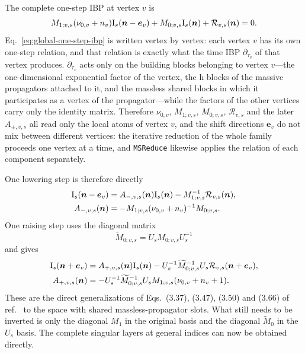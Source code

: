 \documentclass[11pt,a4paper]{article}
\newcommand{\cR}{\mathcal R}
\begin{document}
The complete one-step IBP at vertex $v$ is
\begin{equation}
 M_{1;v,s}(\nu_{0,v}+n_v)\bm{\text I}_s(\bm n-\bm e_v)
 +M_{0;v,s}\bm{\text I}_s(\bm n)
 +\cR_{v,s}(\bm n)=0.
 \label{eq:global-one-step-ibp}
\end{equation}
Eq.~\eqref{eq:global-one-step-ibp} is written vertex by vertex: each vertex $v$ has its own one-step
relation, and that relation is exactly what the time IBP $\partial_{\tau_v}$ of that vertex produces.
$\partial_{\tau_v}$ acts only on the building blocks belonging to vertex $v$---the one-dimensional
exponential factor of the vertex, the h blocks of the massive propagators attached to it, and the massless shared
blocks in which it participates as a vertex of the propagator---while the factors of the other vertices carry only the
identity matrix. Therefore $\nu_{0,v}$, $M_{1;v,s}$, $M_{0;v,s}$, $\cR_{v,s}$ and the later $A_{\pm,v,s}$
all read only the local atoms of vertex $v$, and the shift directions $\bm e_v$ do not mix between
different vertices: the iterative reduction of the whole family proceeds one vertex at a time, and
\texttt{MSReduce} likewise applies the relation of each component separately.

One lowering step is therefore directly
\begin{align}
 \bm{\text I}_s(\bm n-\bm e_v)
 &=A_{-,v,s}(\bm n)\bm{\text I}_s(\bm n)
 -M_{1;v,s}^{-1}\cR_{v,s}(\bm n),\\
 A_{-,v,s}(\bm n)
 &=-M_{1;v,s}(\nu_{0,v}+n_v)^{-1}M_{0;v,s}.
 \label{eq:global-Aminus}
\end{align}
One raising step uses the diagonal matrix
\begin{equation}
 \widetilde M_{0;v,s}=U_sM_{0;v,s}U_s^{-1}
\end{equation}
and gives
\begin{align}
 \bm{\text I}_s(\bm n+\bm e_v)
 &=A_{+,v,s}(\bm n)\bm{\text I}_s(\bm n)
 -U_s^{-1}\widetilde M_{0;v,s}^{-1}U_s
 \cR_{v,s}(\bm n+\bm e_v),\\
 A_{+,v,s}(\bm n)
 &=-U_s^{-1}\widetilde M_{0;v,s}^{-1}U_s
 M_{1;v,s}(\nu_{0,v}+n_v+1).
 \label{eq:global-Aplus}
\end{align}
These are the direct generalizations of Eqs.~(3.37), (3.47), (3.50) and (3.66) of ref.~\cite{Chen:2023eic} to the space with shared massless-propagator slots. What still needs to be inverted is only the diagonal $M_1$ in the original basis and the diagonal $\widetilde M_0$ in the $U_s$ basis. The complete singular layers at general indices can now be obtained directly.
\end{document}

